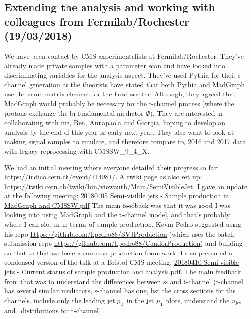 

\subsection{Extending the analysis and working with colleagues from Fermilab/Rochester (19/03/2018)}

We have been contact by CMS experimentalists at Fermilab/Rochester. They've already made private samples with a parameter scan and have looked into discriminating variables for the analysis aspect. They've used Pythia for their s-channel generation as the theorists have stated that both Pythia and MadGraph use the same matrix element for the hard scatter. Although, they agreed that MadGraph would probably be necessary for the t-channel process (where the protons exchange the bi-fundamental mediator $\Phi$). They are interested in collaborating with me, Ben, Annapaola and Giorgia, hoping to develop an analysis by the end of this year or early next year. They also want to look at making signal samples to emulate, and therefore compare to, 2016 and 2017 data with legacy reprocessing with CMSSW\_9\_4\_X.

We had an initial meeting where everyone detailed their progress so far: \url{https://indico.cern.ch/event/714981/}. A twiki page as also set up: \url{https://twiki.cern.ch/twiki/bin/viewauth/Main/SemiVisibleJet}. I gave an update at the following meeting: \href{run:./sec35/20180405 Semi-visible jets - Sample production in MadGraph and CMSSW.pdf}{20180405 Semi-visible jets - Sample production in MadGraph and CMSSW.pdf} The main feedback was that it was good I was looking into using MadGraph and the t-channel model, and that's probably where I can slot in in terms of sample production. Kevin Pedro suggested using his repo \url{https://github.com/kpedro88/SVJProduction} (which uses the batch submission repo \url{https://github.com/kpedro88/CondorProduction}) and building on that so that we have a common production framework. I also presented a condensed version of the talk at a Bristol CMS meeting: \href{run:./sec35/20180410 Semi-visible jets - Current status of sample production and analysis.pdf}{20180410 Semi-visible jets - Current status of sample production and analysis.pdf}. The main feedback from that was to understand the differences between s- and t-channel (t-channel has several similar mediators, s-channel has one, list the cross sections for the channels, include only the leading jet $p_{\mathrm{T}}$ in the jet $p_{\mathrm{T}}$ plots, understand the $n_{\mathrm{jet}}$ and \etmiss\ distributions for t-channel).

